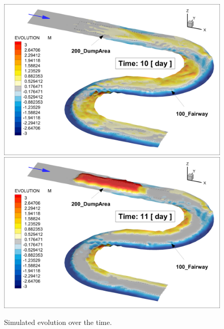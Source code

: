 \begin{figure} [!h]
\centering
\includegraphics[scale=0.14]{critDig_Poly_10p0d.png}
\includegraphics[scale=0.14]{critDig_Poly_11p0d.png}
\caption{Simulated evolution over the time.}\label{result56}
\end{figure}

